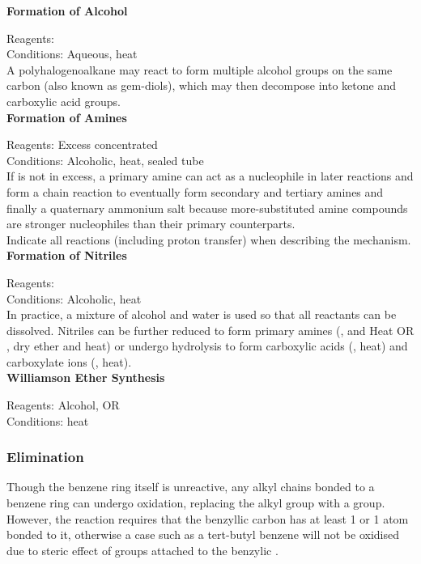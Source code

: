 \documentclass[../main]{subfiles}
\begin{document}
	\noindent \textbf{Formation of Alcohol}

	Reagents:  \\
	Conditions: Aqueous, heat \\

	A polyhalogenoalkane may react to form multiple alcohol groups on the same carbon (also known as gem-diols), which may then decompose into ketone and carboxylic acid groups. \\

	\noindent \textbf{Formation of Amines}

	Reagents: Excess concentrated  \\
	Conditions: Alcoholic, heat, sealed tube \\

	If  is not in excess, a primary amine can act as a nucleophile in later reactions and form a chain reaction to eventually form secondary and tertiary amines and finally a quaternary ammonium salt because more-substituted amine compounds are stronger nucleophiles than their primary counterparts. \\

	Indicate all reactions (including proton transfer) when describing the mechanism. \\

	\noindent \textbf{Formation of Nitriles}

	Reagents:  \\
	Conditions: Alcoholic, heat \\

	In practice, a mixture of alcohol and water is used so that all reactants can be dissolved. Nitriles can be further reduced to form primary amines (,  and Heat OR , dry ether and heat) or undergo hydrolysis to form carboxylic acids (, heat) and carboxylate ions (, heat). \\

	\noindent \textbf{Williamson Ether Synthesis}

	Reagents: Alcohol,  OR \\
	Conditions: heat \\

	\subsubsection{Elimination}

	Though the benzene ring itself is unreactive, any alkyl chains bonded to a benzene ring can undergo oxidation, replacing the alkyl group with a  group. However, the reaction requires that the benzyllic carbon has at least 1  or 1  atom bonded to it, otherwise a case such as a tert-butyl benzene will not be oxidised due to steric effect of  groups attached to the benzylic . \\
\end{document}
